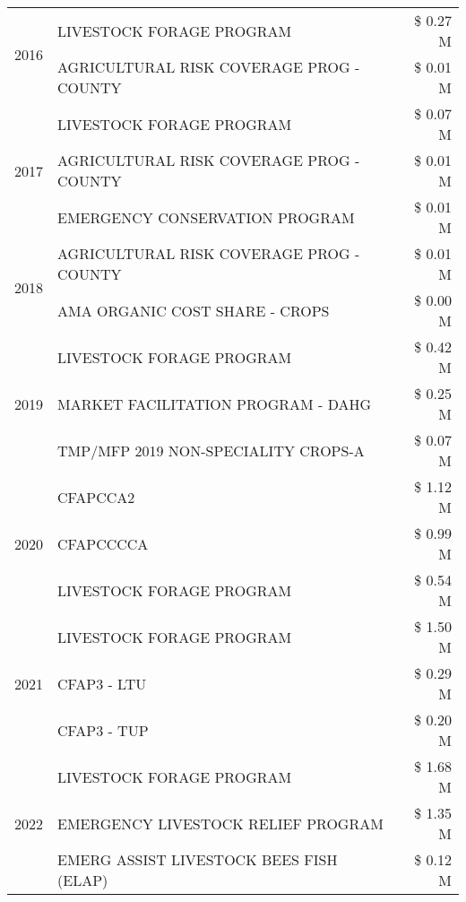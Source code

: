 \begin{tabular}{llr}
\cline{1-3}
\multirow[t]{2}{*}{2016} & LIVESTOCK FORAGE PROGRAM & \$ 0.27 M \\
 & AGRICULTURAL RISK COVERAGE PROG - COUNTY & \$ 0.01 M \\
\cline{1-3}
\multirow[t]{3}{*}{2017} & LIVESTOCK FORAGE PROGRAM & \$ 0.07 M \\
 & AGRICULTURAL RISK COVERAGE PROG - COUNTY & \$ 0.01 M \\
 & EMERGENCY CONSERVATION PROGRAM & \$ 0.01 M \\
\cline{1-3}
\multirow[t]{2}{*}{2018} & AGRICULTURAL RISK COVERAGE PROG - COUNTY & \$ 0.01 M \\
 & AMA ORGANIC COST SHARE - CROPS & \$ 0.00 M \\
\cline{1-3}
\multirow[t]{3}{*}{2019} & LIVESTOCK FORAGE PROGRAM & \$ 0.42 M \\
 & MARKET FACILITATION PROGRAM - DAHG & \$ 0.25 M \\
 & TMP/MFP 2019 NON-SPECIALITY CROPS-A & \$ 0.07 M \\
\cline{1-3}
\multirow[t]{3}{*}{2020} & CFAPCCA2 & \$ 1.12 M \\
 & CFAPCCCCA & \$ 0.99 M \\
 & LIVESTOCK FORAGE PROGRAM & \$ 0.54 M \\
\cline{1-3}
\multirow[t]{3}{*}{2021} & LIVESTOCK FORAGE PROGRAM & \$ 1.50 M \\
 & CFAP3 - LTU & \$ 0.29 M \\
 & CFAP3 - TUP & \$ 0.20 M \\
\cline{1-3}
\multirow[t]{3}{*}{2022} & LIVESTOCK FORAGE PROGRAM & \$ 1.68 M \\
 & EMERGENCY LIVESTOCK RELIEF PROGRAM & \$ 1.35 M \\
 & EMERG ASSIST LIVESTOCK BEES FISH (ELAP) & \$ 0.12 M \\
\cline{1-3}
\bottomrule
\end{tabular}

